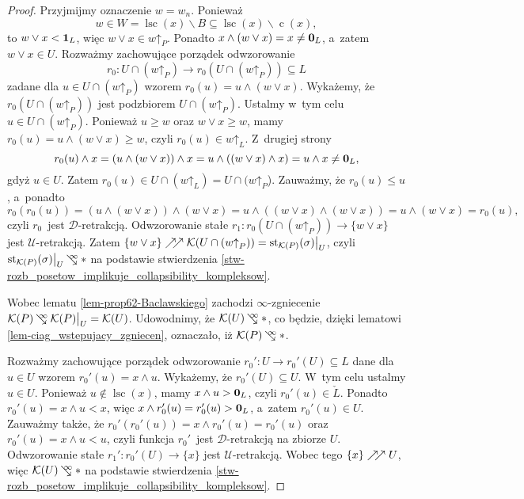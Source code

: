 \begin{proof}
Przyjmijmy oznaczenie $w=w_n$. Ponieważ \[w\in W=\operatorname{lsc}(x)\smallsetminus B\subseteq \operatorname{lsc}(x)\smallsetminus\operatorname{c}(x),\] to $w\lor x<\mathbf{1}_L$, więc $w\lor x\in w\mathord{\uparrow}_P$. Ponadto $x \land (w\lor x)=x\not=\mathbf{0}_L$, a~zatem $w\lor x\in U$. Rozważmy zachowujące porządek odwzorowanie \[r_0\colon U\cap (w\mathord{\uparrow}_P)\to r_0(U\cap (w\mathord{\uparrow}_P))\subseteq L\] zadane dla $u\in U\cap (w\mathord{\uparrow}_P)$ wzorem $r_0(u)=u\land (w\lor x)$. Wykażemy, że \mbox{$r_0(U\cap (w\mathord{\uparrow}_P))$} jest podzbiorem $U\cap (w\mathord{\uparrow}_P)$. Ustalmy w~tym celu $u\in U\cap (w\mathord{\uparrow}_P)$. Ponieważ $u\geq w$ oraz $w\lor x\geq w$, mamy $r_0(u)=u\land (w\lor x)\geq w$, czyli $r_0(u)\in w\mathord{\uparrow}_L$. Z~drugiej strony \[r_0(u)\land x=(u\land (w\lor x))\land x=u\land((w\lor x)\land x)=u\land x\not=\mathbf{0}_L,\] gdyż $u\in U$. Zatem $r_0(u)\in U\cap (w\mathord{\uparrow}_L)=U\cap (w\mathord{\uparrow}_P$). Zauważmy, że $r_0(u)\leq u$, a~ponadto \[r_0(r_0(u))\!=\!(u\land (w\lor x))\!\land\!(w\lor x)\!=\!u\land\!((w\lor x)\!\land\!(w\lor x))\!=\!u\land\!(w\lor x)\!=\!r_0(u),\] czyli $r_0$~jest $\mathcal{D}$-retrakcją. Odwzorowanie stałe $r_1\colon r_0(U\cap (w\mathord{\uparrow}_P))\to \{w\lor x\}$ jest \mbox{$\mathcal{U}$-retrakcją}. Zatem $\{w\lor x\}\nearrow\!\!\nearrow \mathcal{K}(U\cap (w\mathord{\uparrow}_P))=\operatorname{st}_{\mathcal{K}(P)}(\sigma)\big|_U$, czyli $\st_{\mK(P)}(\sigma)\big|_U\infcoll *$ na podstawie stwierdzenia \ref{stw-rozb_posetow_implikuje_collapsibility_kompleksow}.

Wobec lematu \ref{lem-prop62-Baclawskiego} zachodzi \mbox{$\infty$-zgniecenie} $\mK(P)\infcoll \mK(P)\big|_U=\mK(U)$. Udowodnimy, że $\mK(U)\infcoll *$, co będzie, dzięki lematowi \ref{lem-ciag_wstepujacy_zgniecen}, oznaczało, iż $\mK(P)\infcoll *$.

Rozważmy zachowujące porządek odwzorowanie $r_0'\colon U\to r_0'(U)\subseteq L$ dane dla $u\in U$ wzorem $r_0'(u)=x\land u$. Wykażemy, że $r_0'(U)\subseteq U$. W~tym celu ustalmy $u\in U$. Ponieważ $u\not\in\operatorname{lsc}(x)$, mamy $x\land u>\mathbf{0}_L$, czyli $r_0'(u)\in\check{L}$. Ponadto $r_0'(u)=x\land u<x$, więc $x\land r_0'(u)=r_0'(u)>\mathbf{0}_L$, a~zatem $r_0'(u)\in U$. Zauważmy także, że $r_0'(r_0'(u))=x\land r_0'(u)=r_0'(u)$ oraz $r_0'(u)=x\land u<u$, czyli funkcja $r_0'$~jest $\mathcal{D}$-retrakcją na zbiorze $U$. Odwzorowanie stałe $r_1'\colon r_0'(U)\to \{x\}$ jest $\mathcal{U}$-retrakcją. Wobec tego $\{x\}\nearrow\!\!\nearrow U$, więc $\mK(U)\infcoll *$ na podstawie stwierdzenia \ref{stw-rozb_posetow_implikuje_collapsibility_kompleksow}.
\end{proof}

